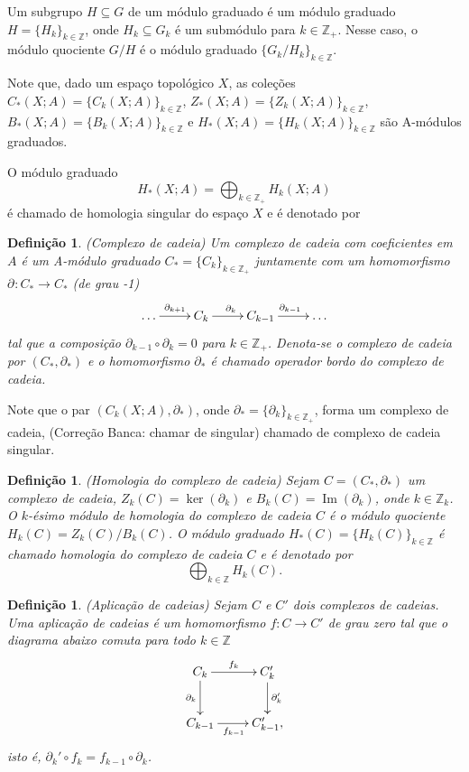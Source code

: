 \documentclass[12pt]{book}
\newtheorem{definicao}[teorema]{Definição}
\DeclareMathOperator{\Ima}{Im}
\newcommand{\bordo}[1]{\partial_{#1}}
\newcommand{\cadeia}[2]{C_{#1}(#2; A)}
\newcommand{\colecao}[1]{\{#1_{k} \}_{k\in \inteiros}}
\newcommand{\colecaoabrev}[1]{\{#1 \}_{k\in \inteiros}}
\newcommand{\homologia}[2]{H_{#1}(#2;A)}
\newcommand{\homologiaabrev}[2]{H_{#1}(#2)}
\newcommand{\imagem}[1]{\Ima(#1)}
\newcommand{\imagembordo}[2]{B_{#1}(#2;A)}
\newcommand{\imagembordoabrev}[2]{B_{#1}(#2)}
\newcommand{\inteiros}{\mathbb{Z}}
\newcommand{\kernelbordo}[2]{Z_{#1}(#2;A)}
\newcommand{\kernelbordoabrev}[2]{Z_{#1}(#2)}
\newcommand{\alerta}[1]{{\color{red}#1}}
\newcommand{\correcaobanca}[1]{\alerta{(Correção Banca: #1)}}
\begin{document}
	Um subgrupo $H\subseteq G$ de um módulo graduado é um módulo graduado $H=\colecao{H}$, onde $H_{k} \subseteq G_{k}$ é um submódulo para $k \in \inteiros_{+}$. Nesse caso, o módulo quociente $G/H$ é o módulo graduado $\{G_{k}/H_{k} \}_{k\in \inteiros}$.
	
	Note que, dado um espaço topológico $X$, as coleções $\cadeia{*}{X} = \colecaoabrev{\cadeia{k}{X}}$, $\kernelbordo{*}{X}=\colecaoabrev{\kernelbordo{k}{X}}$, $\imagembordo{*}{X}=\colecaoabrev{\imagembordo{k}{X}}$ e $\homologia{*}{X}=\colecaoabrev{\homologia{k}{X}}$ são A-módulos graduados.
	
	O módulo graduado 
	$$
	\homologia{*}{X}=\bigoplus_{k\in \inteiros_{+}}\homologia{k}{X}
	$$
	é chamado de homologia singular do espaço $X$ e é denotado por
	
	\begin{definicao}
		(Complexo de cadeia) Um complexo de cadeia com coeficientes em $A$ é um A-módulo graduado $C_{*} = \{C_{k}\}_{k \in \inteiros_{+} } $ juntamente com um homomorfismo $\bordo{}:C_{*} \to C_{*}$ (de grau -1)
		$$
		\xymatrix{
			\dots \ar[r]^{\bordo{k+1}}  & C_{k} \ar[r]^{\bordo{k}} & C_{k-1}\ar[r]^{\bordo{k-1}} &\dots
		}
		$$
		tal que a composição $\bordo{k-1}\circ\bordo{k} = 0$ para $k \in \inteiros_{+}$. Denota-se o complexo de cadeia por $(C_{*}, \bordo{*})$ e o homomorfismo $\bordo{*}$ é chamado operador bordo do complexo de cadeia.
	\end{definicao}
	
	Note que o par $(\cadeia{k}{X}, \bordo{*})$, onde $\bordo{*}=\{\bordo{k}\}_{k\in \inteiros_{+}}$, forma um complexo de cadeia, \correcaobanca{chamar de singular} chamado de complexo de cadeia singular.
	
	\begin{definicao}
		(Homologia do complexo de cadeia) Sejam $C=(C_{*}, \bordo{*})$ um complexo de cadeia, $Z_{k}(C) = \ker(\bordo{k})$ e $B_{k}(C) = \imagem{\bordo{k}}$, onde $k\in \inteiros_{k}$. O $k$-ésimo módulo de homologia do complexo de cadeia $C$ é o módulo quociente
		$\homologiaabrev{k}{C} = \kernelbordoabrev{k}{C}/\imagembordoabrev{k}{C}$. O módulo graduado $\homologiaabrev{*}{C} = \colecaoabrev{\homologiaabrev{k}{C}}$ é chamado homologia do complexo de cadeia $C$ e é denotado por
		$$
		\bigoplus_{k\in \inteiros}\homologiaabrev{k}{C}.
		$$				
	\end{definicao}

	\begin{definicao}
		(Aplicação de cadeias) Sejam $C$ e $C'$ dois complexos de cadeias. Uma aplicação de cadeias é um homomorfismo $f:C\to C'$ de grau zero tal que o diagrama abaixo comuta para todo $k \in \inteiros$
		$$
		\xymatrix{
			C_{k}\ar[d]_{\bordo{k}}\ar[r]^{f_{k}}  & C'_{k}\ar[d]^{\bordo{k}'} 
			\\
			C_{k-1}\ar[r]_{f_{k-1}} & C'_{k-1},
		}
		$$
		isto é, $\bordo{k}'\circ f_{k} = f_{k-1}\circ \bordo{k}$.
	\end{definicao}
	
\end{document}
